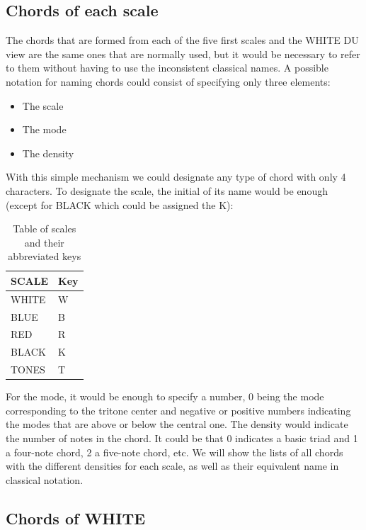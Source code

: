 \documentclass[]{report}
\begin{document}
\subsection{Chords of each scale}
The chords that are formed from each of the five first scales and the \textsf{WHITE DU} view are the same ones that are normally used, but it would be necessary to refer to them without having to use the inconsistent classical names.
A possible notation for naming chords could consist of specifying only three elements:
\begin{itemize}
\item The scale
\item The mode
\item The density
\end{itemize}
With this simple mechanism we could designate any type of chord with only 4 characters.
To designate the scale, the initial of its name would be enough (except for \textsf{BLACK} which could be assigned the \textsf{K}):
\begin{table}[H]
\centering
\begin{tabular}{ll}
\toprule
SCALE & Key \\
\midrule
\textsf{WHITE} & W \\
\textsf{BLUE} & B \\
\textsf{RED} & R \\
\textsf{BLACK} & K \\
\textsf{TONES} & T \\
\bottomrule
\end{tabular}
\caption{Table of scales and their abbreviated keys}\label{tab:scales-and-keys}
\end{table}
For the mode, it would be enough to specify a number, 0 being the mode corresponding to the tritone center and negative or positive numbers indicating the modes that are above or below the central one.
The density would indicate the number of notes in the chord. It could be that 0 indicates a basic triad and 1 a four-note chord, 2 a five-note chord, etc.
We will show the lists of all chords with the different densities for each scale, as well as their equivalent name in classical notation.
\subsection*{Chords of WHITE}
\end{document}
